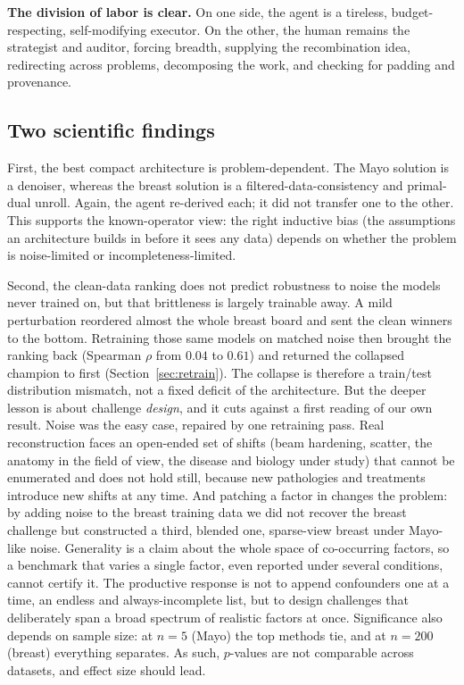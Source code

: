 \documentclass[AMA,twocolumn]{USG} %
\begin{document}
\textbf{The division of labor is clear.} On one side, the agent is a tireless, budget-respecting, self-modifying executor. On the other, the human remains the strategist and auditor, forcing breadth, supplying the recombination idea, redirecting across problems, decomposing the work, and checking for padding and provenance.

\subsection{Two scientific findings}\label{sec:findings}

First, the best compact architecture is problem-dependent. The Mayo solution is a denoiser, whereas the breast solution is a filtered-data-consistency and primal-dual unroll. Again, the agent re-derived each; it did not transfer one to the other. This supports the known-operator view: the right inductive bias (the assumptions an architecture builds in before it sees any data) depends on whether the problem is noise-limited or incompleteness-limited.

Second, the clean-data ranking does not predict robustness to noise the models never trained on, but that brittleness is largely trainable away. A mild perturbation reordered almost the whole breast board and sent the clean winners to the bottom. Retraining those same models on matched noise then brought the ranking back (Spearman $\rho$ from $0.04$ to $0.61$) and returned the collapsed champion to first (Section~\ref{sec:retrain}). The collapse is therefore a train/test distribution mismatch, not a fixed deficit of the architecture. But the deeper lesson is about challenge \emph{design}, and it cuts against a first reading of our own result. Noise was the easy case, repaired by one retraining pass. Real reconstruction faces an open-ended set of shifts (beam hardening, scatter, the anatomy in the field of view, the disease and biology under study) that cannot be enumerated and does not hold still, because new pathologies and treatments introduce new shifts at any time. And patching a factor in changes the problem: by adding noise to the breast training data we did not recover the breast challenge but constructed a third, blended one, sparse-view breast under Mayo-like noise. Generality is a claim about the whole space of co-occurring factors, so a benchmark that varies a single factor, even reported under several conditions, cannot certify it. The productive response is not to append confounders one at a time, an endless and always-incomplete list, but to design challenges that deliberately span a broad spectrum of realistic factors at once. Significance also depends on sample size: at $n=5$ (Mayo) the top methods tie, and at $n=200$ (breast) everything separates. As such, $p$-values are not comparable across datasets, and effect size should lead.
\end{document}

